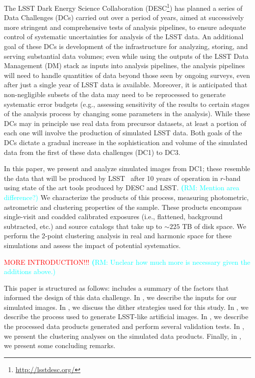 \documentclass[twocolumn]{aastex62}
\newcommand{\rachel}[1]{{\textcolor{cyan}{{\textbf (RM: #1)}}}}
\begin{document}
The LSST Dark Energy Science Collaboration (DESC\footnote{\url{http://lsstdesc.org/}}) has planned a
series of Data Challenges (DCs) carried out over a period of years, aimed at successively
more stringent and comprehensive tests of analysis pipelines, to ensure adequate control of
systematic uncertainties for analysis of the LSST data.  An additional goal of these DCs is
development of the infrastructure for analyzing, storing, and serving substantial data volumes; even
while using the outputs of the LSST Data Management (DM) stack as inputs into analysis pipelines,
the analysis pipelines will need to handle quantities of data beyond those seen by ongoing surveys,
even after just a single year of LSST data is available.  Moreover, it is anticipated that
non-negligible subsets of the data may need to be reprocessed to generate systematic error budgets
(e.g., assessing sensitivity of the results to certain stages of the analysis process by changing
some parameters in the analysis).  While these DCs may in principle use real
data from precursor datasets, at least a portion of each one will involve the production of
simulated LSST data.  Both goals of the DCs dictate a gradual increase in the sophistication and
volume of the simulated data from the first of these data challenges (DC1) to DC3.

In this paper, we present and analyze simulated images from DC1; these resemble the data that will be produced by
LSST~\citep{Overview} after 10 years of operation in $r$-band using state of the art tools produced by DESC and LSST. \rachel{Mention area difference?} We characterize the products of this process, measuring photometric, astrometric and clustering properties of the sample. These products encompass single-visit and coadded calibrated exposures (i.e., flattened, background subtracted, etc.) and source catalogs that take up to $\sim 225$ TB of disk space. We perform the 2-point clustering analysis in real and harmonic space for these simulations and assess the impact of potential systematics.

\textcolor{red}{MORE INTRODUCTION!!!} \rachel{Unclear how much more is necessary given the additions
above.}

This paper is structured as follows:  includes a summary of the factors that informed
the design of this data challenge.  In , we describe the inputs for our simulated images. In , we discuss the dither strategies used for this study. In , we describe the process used to generate LSST-like artificial images. In , we describe the processed data products generated and perform several validation tests. In , we present the clustering analyses on the simulated data products. Finally, in , we present some concluding remarks.
\end{document}
